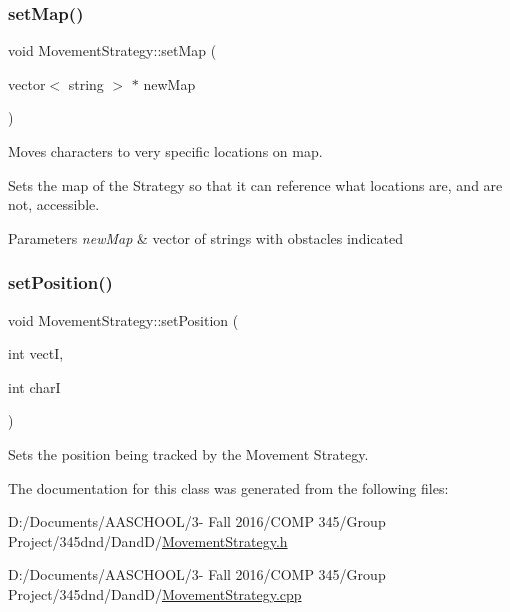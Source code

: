 \subsubsection{\texorpdfstring{set\+Map()}{setMap()}}
{\footnotesize\ttfamily void Movement\+Strategy\+::set\+Map (\begin{DoxyParamCaption}\item[{vector$<$ string $>$ $\ast$}]{new\+Map }\end{DoxyParamCaption})\hspace{0.3cm}{\ttfamily [virtual]}}



Moves characters to very specific locations on map. 

Sets the map of the Strategy so that it can reference what locations are, and are not, accessible. 
\begin{DoxyParams}{Parameters}
{\em new\+Map} & vector of strings with obstacles indicated \\
\hline
\end{DoxyParams}
\hypertarget{class_movement_strategy_a463bed0000abe0953b1ca6549498775c}{}\label{class_movement_strategy_a463bed0000abe0953b1ca6549498775c} 
\subsubsection{\texorpdfstring{set\+Position()}{setPosition()}}
{\footnotesize\ttfamily void Movement\+Strategy\+::set\+Position (\begin{DoxyParamCaption}\item[{int}]{vectI,  }\item[{int}]{charI }\end{DoxyParamCaption})\hspace{0.3cm}{\ttfamily [virtual]}}

Sets the position being tracked by the Movement Strategy. 

The documentation for this class was generated from the following files\+:\begin{DoxyCompactItemize}
\item 
D\+:/\+Documents/\+A\+A\+S\+C\+H\+O\+O\+L/3-\/ Fall 2016/\+C\+O\+M\+P 345/\+Group Project/345dnd/\+Dand\+D/\hyperlink{_movement_strategy_8h}{Movement\+Strategy.\+h}\item 
D\+:/\+Documents/\+A\+A\+S\+C\+H\+O\+O\+L/3-\/ Fall 2016/\+C\+O\+M\+P 345/\+Group Project/345dnd/\+Dand\+D/\hyperlink{_movement_strategy_8cpp}{Movement\+Strategy.\+cpp}\end{DoxyCompactItemize}
